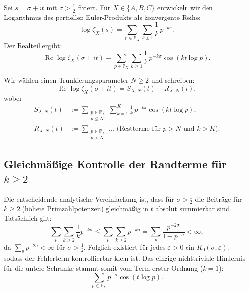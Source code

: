 \documentclass[11pt]{article}
\newcommand{\Rea}{\operatorname{Re}}
\newcommand{\Pcal}{\mathbb P}
\begin{document}
Sei $s=\sigma+it$ mit $\sigma> \tfrac12$ fixiert.
Für $X\in\{A,B,C\}$ entwickeln wir den Logarithmus des partiellen Euler-Produkts als konvergente Reihe:
\begin{equation}\label{eq:log_expand}
\log \zeta_X(s)
=
\sum_{p\in \Pcal_X}\sum_{k\ge1}\frac{1}{k}\,p^{-ks}.
\end{equation}
Der Realteil ergibt:
\begin{equation}\label{eq:real_log_expand}
\Rea\log \zeta_X(\sigma+it)
=
\sum_{p\in \Pcal_X}\sum_{k\ge1}\frac{1}{k}\,p^{-k\sigma}\cos(k t\log p).
\end{equation}

Wir wählen einen Trunkierungsparameter $N\ge 2$ und schreiben:
\begin{equation}\label{eq:split_SN_RN}
\Rea\log \zeta_X(\sigma+it)=S_{X,N}(t)+R_{X,N}(t),
\end{equation}
wobei
\begin{align}
S_{X,N}(t)
&:=
\sum_{\substack{p\in \Pcal_X\\ p\le N}}
\sum_{k=1}^{K}\frac{1}{k}\,p^{-k\sigma}\cos(k t\log p), \label{eq:SN_def}\\
R_{X,N}(t)
&:=
\sum_{\substack{p\in \Pcal_X\\ p> N}}
\dots 
\text{ (Restterme für } p > N \text{ und } k > K).
\end{align}

\subsection{Gleichmäßige Kontrolle der Randterme für $k\ge 2$} 

Die entscheidende analytische Vereinfachung ist, dass für $\sigma>\tfrac12$ die Beiträge für $k\ge 2$ (höhere Primzahlpotenzen) gleichmäßig in $t$ absolut summierbar sind.
Tatsächlich gilt:
\begin{equation}\label{eq:tail_kge2_bound}
\sum_{p}\sum_{k\ge2}\frac{1}{k}p^{-k\sigma}
\le
\sum_{p}\sum_{k\ge2}p^{-k\sigma}
=
\sum_{p}\frac{p^{-2\sigma}}{1-p^{-\sigma}}
<\infty,
\end{equation}
da $\sum_p p^{-2\sigma}<\infty$ für $\sigma>\tfrac12$.
Folglich existiert für jedes $\varepsilon>0$ ein $K_0(\sigma,\varepsilon)$, sodass der Fehlerterm kontrollierbar klein ist.
Das einzige nichttriviale Hindernis für die untere Schranke stammt somit vom Term erster Ordnung ($k=1$):
\begin{equation}\label{eq:k1_term}
\sum_{p\in\Pcal_X} p^{-\sigma}\cos(t\log p).
\end{equation}
\end{document}

